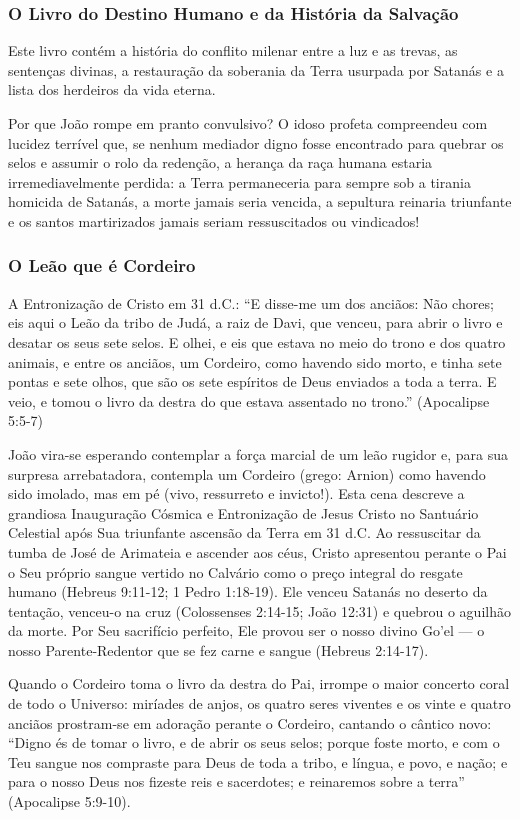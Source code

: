 \subsubsection*{O Livro do Destino Humano e da História da Salvação}
Este livro contém a história do conflito milenar entre a luz e as trevas, as sentenças divinas, a restauração da soberania da Terra usurpada por Satanás e a lista dos herdeiros da vida eterna.

Por que João rompe em pranto convulsivo? O idoso profeta compreendeu com lucidez terrível que, se nenhum mediador digno fosse encontrado para quebrar os selos e assumir o rolo da redenção, a herança da raça humana estaria irremediavelmente perdida: a Terra permaneceria para sempre sob a tirania homicida de Satanás, a morte jamais seria vencida, a sepultura reinaria triunfante e os santos martirizados jamais seriam ressuscitados ou vindicados!


\subsubsection*{O Leão que é Cordeiro}
A Entronização de Cristo em 31 d.C.:
``E disse-me um dos anciãos: Não chores; eis aqui o Leão da tribo de Judá, a raiz de Davi, que venceu, para abrir o livro e desatar os seus sete selos. E olhei, e eis que estava no meio do trono e dos quatro animais, e entre os anciãos, um Cordeiro, como havendo sido morto, e tinha sete pontas e sete olhos, que são os sete espíritos de Deus enviados a toda a terra. E veio, e tomou o livro da destra do que estava assentado no trono.'' (Apocalipse 5:5-7)

João vira-se esperando contemplar a força marcial de um leão rugidor e, para sua surpresa arrebatadora, contempla um Cordeiro (grego: Arnion) como havendo sido imolado, mas em pé (vivo, ressurreto e invicto!).
Esta cena descreve a grandiosa Inauguração Cósmica e Entronização de Jesus Cristo no Santuário Celestial após Sua triunfante ascensão da Terra em 31 d.C. Ao ressuscitar da tumba de José de Arimateia e ascender aos céus, Cristo apresentou perante o Pai o Seu próprio sangue vertido no Calvário como o preço integral do resgate humano (Hebreus 9:11-12; 1 Pedro 1:18-19). Ele venceu Satanás no deserto da tentação, venceu-o na cruz (Colossenses 2:14-15; João 12:31) e quebrou o aguilhão da morte. Por Seu sacrifício perfeito, Ele provou ser o nosso divino Go'el — o nosso Parente-Redentor que se fez carne e sangue (Hebreus 2:14-17).

Quando o Cordeiro toma o livro da destra do Pai, irrompe o maior concerto coral de todo o Universo: miríades de anjos, os quatro seres viventes e os vinte e quatro anciãos prostram-se em adoração perante o Cordeiro, cantando o cântico novo: ``Digno és de tomar o livro, e de abrir os seus selos; porque foste morto, e com o Teu sangue nos compraste para Deus de toda a tribo, e língua, e povo, e nação; e para o nosso Deus nos fizeste reis e sacerdotes; e reinaremos sobre a terra'' (Apocalipse 5:9-10).



